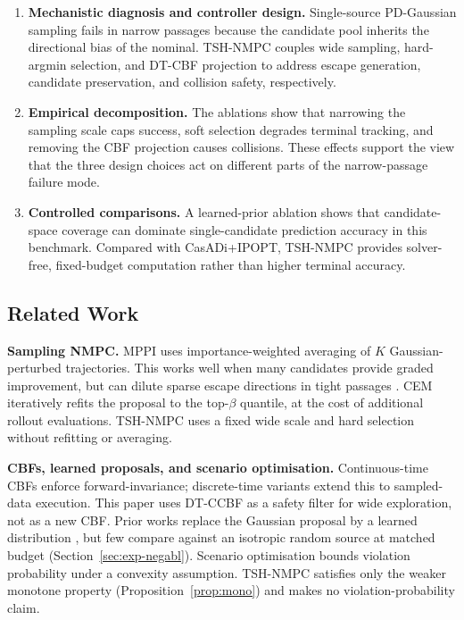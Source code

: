 \documentclass[11pt,onecolumn,a4paper]{article}
\begin{document}
\begin{enumerate}
\item \textbf{Mechanistic diagnosis and controller design.}
Single-source PD-Gaussian sampling fails in narrow passages because
the candidate pool inherits the directional bias of the nominal.
TSH-NMPC couples wide sampling, hard-argmin selection, and DT-CBF
projection to address escape generation, candidate preservation, and
collision safety, respectively.

\item \textbf{Empirical decomposition.} The ablations show that
narrowing the sampling scale caps success, soft selection degrades
terminal tracking, and removing the CBF projection causes collisions.
These effects support the view that the three design choices act on
different parts of the narrow-passage failure mode.

\item \textbf{Controlled comparisons.} A learned-prior ablation shows
that candidate-space coverage can dominate single-candidate prediction
accuracy in this benchmark. Compared with CasADi+IPOPT, TSH-NMPC
provides solver-free, fixed-budget computation rather than higher
terminal accuracy.
\end{enumerate}

\subsection{Related Work}

\textbf{Sampling NMPC.} MPPI \cite{WIL17,WIL18} uses
importance-weighted averaging of $K$ Gaussian-perturbed trajectories.
This works well when many candidates provide graded improvement, but
can dilute sparse escape directions in tight passages
\cite{SUN22,GAN21}. CEM \cite{BOT13,RUB04} iteratively refits the
proposal to the top-$\beta$ quantile, at the cost of additional
rollout evaluations. TSH-NMPC uses a fixed wide scale and hard
selection without refitting or averaging.

\textbf{CBFs, learned proposals, and scenario optimisation.}
Continuous-time CBFs \cite{AME17} enforce forward-invariance;
discrete-time variants \cite{WAN17} extend this to sampled-data
execution. This paper uses DT-CCBF as a safety filter for wide
exploration, not as a new CBF. Prior works replace the Gaussian
proposal by a learned distribution \cite{PAN17,KAH18,OKA20,JAN22},
but few compare against an isotropic random source at matched budget
(Section~\ref{sec:exp-negabl}). Scenario optimisation
\cite{CAM08,CAM18} bounds violation probability under a convexity
assumption. TSH-NMPC satisfies only the weaker monotone property
(Proposition~\ref{prop:mono}) and makes no violation-probability
claim.
\end{document}
